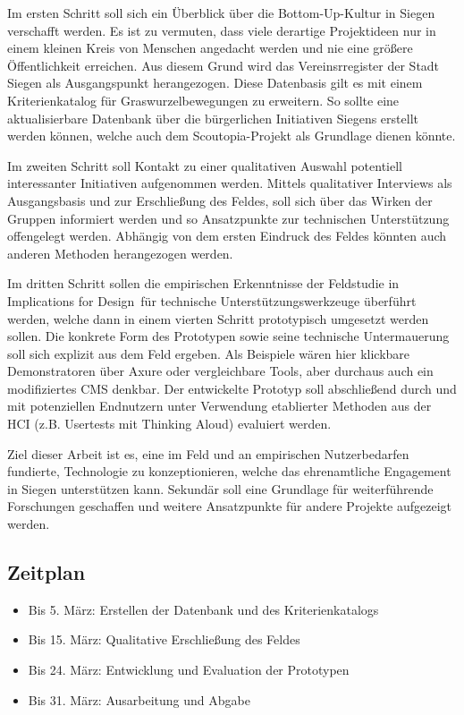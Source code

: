 \documentclass[a4paper,oneside,DIV8,10pt]{scrartcl}
\begin{document}
Im ersten Schritt soll sich ein Überblick über die Bottom-Up-Kultur in Siegen verschafft werden. 
Es ist zu vermuten, dass viele derartige Projektideen nur in einem kleinen Kreis von Menschen angedacht werden und nie eine größere Öffentlichkeit erreichen. Aus diesem Grund wird das Vereinsrregister der Stadt Siegen als Ausgangspunkt herangezogen. Diese Datenbasis gilt es mit einem Kriterienkatalog für Graswurzelbewegungen zu erweitern. So sollte eine aktualisierbare Datenbank über die bürgerlichen Initiativen Siegens erstellt werden können, welche auch dem Scoutopia-Projekt als Grundlage dienen könnte.

Im zweiten Schritt soll Kontakt zu einer qualitativen Auswahl potentiell interessanter Initiativen aufgenommen werden. Mittels qualitativer Interviews als Ausgangsbasis und zur Erschließung des Feldes, soll sich über das Wirken der Gruppen informiert werden und so Ansatzpunkte zur technischen Unterstützung offengelegt werden. Abhängig von dem ersten Eindruck des Feldes könnten auch anderen Methoden herangezogen werden. 

Im dritten Schritt sollen die empirischen Erkenntnisse der Feldstudie in \glqq Implications for Design\grqq ~für technische Unterstützungswerkzeuge überführt werden, welche dann in einem vierten Schritt prototypisch umgesetzt werden sollen. Die konkrete Form des Prototypen sowie seine technische Untermauerung soll sich explizit aus dem Feld ergeben. Als Beispiele wären hier klickbare Demonstratoren über Axure oder vergleichbare Tools, aber durchaus auch ein modifiziertes CMS denkbar. Der entwickelte Prototyp soll abschließend durch und mit potenziellen Endnutzern unter Verwendung etablierter Methoden aus der HCI (z.B. Usertests mit \glqq Thinking Aloud\grqq ) evaluiert werden.

Ziel dieser Arbeit ist es, eine im Feld und an empirischen Nutzerbedarfen fundierte, Technologie zu konzeptionieren, welche das ehrenamtliche Engagement in Siegen unterstützen kann. Sekundär soll eine Grundlage für weiterführende Forschungen geschaffen und weitere Ansatzpunkte für andere Projekte aufgezeigt werden. 

\subsection*{Zeitplan}
\begin{itemize}
\item Bis 5. März: Erstellen der Datenbank und des Kriterienkatalogs 
\item Bis 15. März: Qualitative Erschließung des Feldes
\item Bis 24. März: Entwicklung und Evaluation der Prototypen
\item Bis 31. März: Ausarbeitung und Abgabe
\end{itemize}
\end{document}
